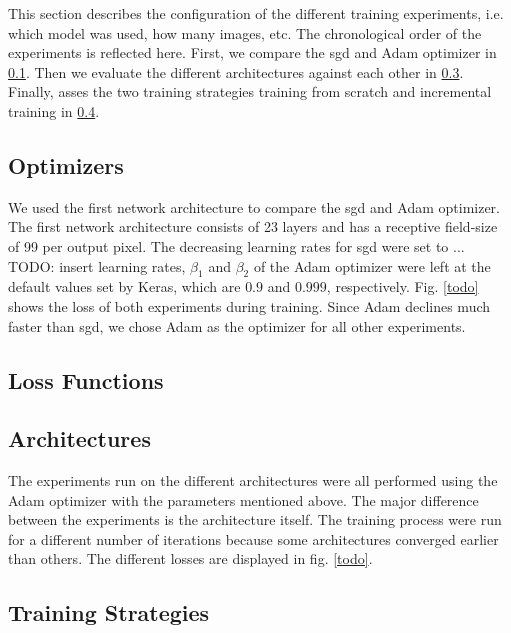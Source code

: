 This section describes the configuration of the different training experiments, i.e. which model was used, how many images, etc. The chronological order of the experiments is reflected here. First, we compare the \gls{sgd} and Adam optimizer in \ref{subsection:optimizers}. Then we evaluate the different architectures against each other in \ref{subsection:architectures}. Finally, asses the two training strategies training from scratch and incremental training in \ref{subsection:training_strategies}.

\subsection{Optimizers} \label{subsection:optimizers}

We used the first network architecture to compare the \gls{sgd} and Adam optimizer. The first network architecture consists of 23 layers and has a receptive field-size of 99 per output pixel. The decreasing learning rates for \gls{sgd} were set to ... TODO: insert learning rates, $\beta_1$ and $\beta_2$ of the Adam optimizer were left at the default values set by Keras, which are $0.9$ and $0.999$, respectively. Fig. \ref{todo} shows the loss of both experiments during training. Since Adam declines much faster than \gls{sgd}, we chose Adam as the optimizer for all other experiments.

\subsection{Loss Functions}


\subsection{Architectures} \label{subsection:architectures}

The experiments run on the different architectures were all performed using the Adam optimizer with the parameters mentioned above. The major difference between the experiments is the architecture itself. The training process were run for a different number of iterations because some architectures converged earlier than others. The different losses are displayed in fig. \ref{todo}.

\subsection{Training Strategies} \label{subsection:training_strategies}

